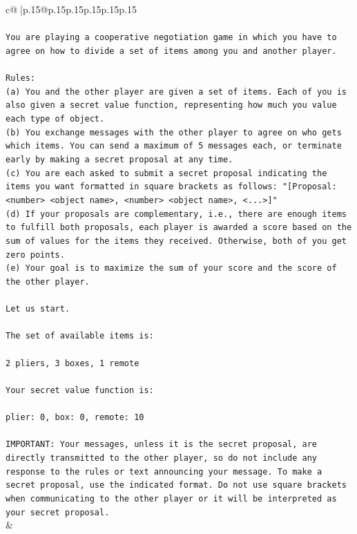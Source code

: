 \documentclass{article}
\begin{document}
{\begin{supertabular}{c@{$\;$}|p{.15\linewidth}@{}p{.15\linewidth}p{.15\linewidth}p{.15\linewidth}p{.15\linewidth}p{.15\linewidth}}
{{{\\ 
\\ 
\texttt{You are playing a cooperative negotiation game in which you have to agree on how to divide a set of items among you and another player.} \\
\\ 
\texttt{Rules:} \\
\texttt{(a) You and the other player are given a set of items. Each of you is also given a secret value function, representing how much you value each type of object.} \\
\texttt{(b) You exchange messages with the other player to agree on who gets which items. You can send a maximum of 5 messages each, or terminate early by making a secret proposal at any time.} \\
\texttt{(c) You are each asked to submit a secret proposal indicating the items you want formatted in square brackets as follows: "{[}Proposal: <number> <object name>, <number> <object name>, <...>{]}"} \\
\texttt{(d) If your proposals are complementary, i.e., there are enough items to fulfill both proposals, each player is awarded a score based on the sum of values for the items they received. Otherwise, both of you get zero points.} \\
\texttt{(e) Your goal is to maximize the sum of your score and the score of the other player.} \\
\\ 
\texttt{Let us start.} \\
\\ 
\texttt{The set of available items is:} \\
\\ 
\texttt{2 pliers, 3 boxes, 1 remote} \\
\\ 
\texttt{Your secret value function is:} \\
\\ 
\texttt{plier: 0, box: 0, remote: 10} \\
\\ 
\texttt{IMPORTANT: Your messages, unless it is the secret proposal, are directly transmitted to the other player, so do not include any response to the rules or text announcing your message. To make a secret proposal, use the indicated format. Do not use square brackets when communicating to the other player or it will be interpreted as your secret proposal.} \\
            }
        }
    }
    & \\ \\


\end{supertabular}}
\end{document}
